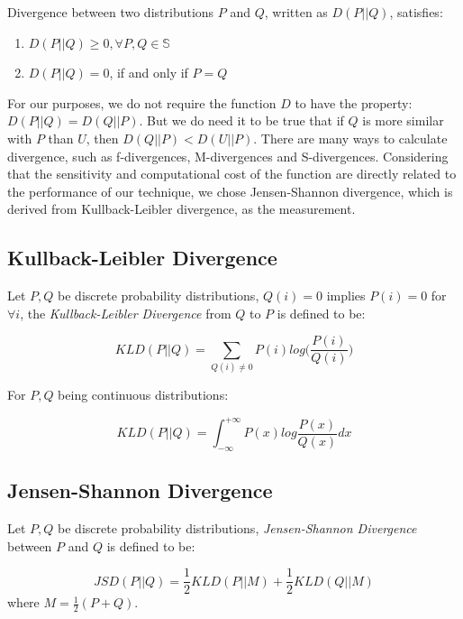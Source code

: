 \documentclass[10pt,conference,letterpaper]{IEEEtran}
\begin{document}
		Divergence between two distributions $P$ and $Q$, written as $D(P||Q)$, satisfies:
	
		\begin{enumerate}
			\item $D(P||Q) \ge 0, \forall P, Q \in \mathbb{S}$
			\item $D(P||Q) = 0$, if and only if $P=Q$
		\end{enumerate}
	
		For our purposes, we do not require the function $D$ to have the property: $D(P||Q) = D(Q||P)$. But we do need it to be true that if $Q$ is more similar with $P$ than $U$, then $D(Q||P) < D(U||P)$. There are many ways to calculate divergence, such as f-divergences, M-divergences and S-divergences.
		Considering that the sensitivity and computational cost of the function are directly related to the performance of our technique, we chose Jensen-Shannon divergence, which is derived from Kullback-Leibler divergence, as the measurement.
	
		\subsection{Kullback-Leibler Divergence}
			Let $P,Q$ be discrete probability distributions, $Q(i)=0$ implies $P(i)=0$ for $\forall i$, the \textit{Kullback-Leibler Divergence} from $Q$ to $P$ is defined to be:
	
			\begin{equation}
				KLD(P||Q) = \sum_{Q(i)\ne 0} P(i)log\Big(\frac{P(i)}{Q(i)}\Big)
			\end{equation}
	
			For $P,Q$ being continuous distributions:
	
			\begin{equation}
				KLD(P||Q) = \int_{-\infty}^{+\infty} P(x)log\frac{P(x)}{Q(x)}dx
			\end{equation}
	
		\subsection{Jensen-Shannon Divergence}
			Let $P,Q$ be discrete probability distributions, \textit{Jensen-Shannon Divergence} between $P$ and $Q$ is defined to be:
	
			\begin{equation}
				JSD(P||Q) = \frac{1}{2}KLD(P||M) + \frac{1}{2}KLD(Q||M)
			\end{equation}
			where $\displaystyle M = \frac{1}{2}(P+Q)$.
	
\end{document}
